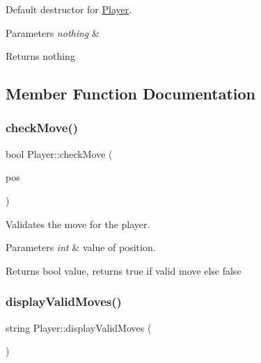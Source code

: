 Default destructor for \mbox{\hyperlink{classPlayer}{Player}}. 


\begin{DoxyParams}{Parameters}
{\em nothing} & \\
\hline
\end{DoxyParams}
\begin{DoxyReturn}{Returns}
nothing 
\end{DoxyReturn}


\subsection{Member Function Documentation}
\mbox{\label{classPlayer_a304c0a31df5ccf7acbdb2a2381facbb5}} 
\subsubsection{\texorpdfstring{check\+Move()}{checkMove()}}
{\footnotesize\ttfamily bool Player\+::check\+Move (\begin{DoxyParamCaption}\item[{int}]{pos }\end{DoxyParamCaption})}



Validates the move for the player. 


\begin{DoxyParams}{Parameters}
{\em int} & value of position. \\
\hline
\end{DoxyParams}
\begin{DoxyReturn}{Returns}
bool value, returns true if valid move else false 
\end{DoxyReturn}
\mbox{\label{classPlayer_a00b37112d7ee56c91a0219dcacaece68}} 
\subsubsection{\texorpdfstring{display\+Valid\+Moves()}{displayValidMoves()}}
{\footnotesize\ttfamily string Player\+::display\+Valid\+Moves (\begin{DoxyParamCaption}{ }\end{DoxyParamCaption})}




